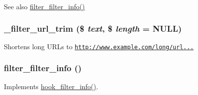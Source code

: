 \begin{DoxySeeAlso}{See also}
\hyperlink{group__standard__filters_ga38089b90576e648c56228ee99c9c1767}{filter\_\-filter\_\-info()} 
\end{DoxySeeAlso}
\hypertarget{group__standard__filters_gae320ec54b6c197f3263c2d54a4477e55}{
\subsubsection[{\_\-filter\_\-url\_\-trim}]{\setlength{\rightskip}{0pt plus 5cm}\_\-filter\_\-url\_\-trim (\$ {\em text}, \/  \$ {\em length} = {\ttfamily NULL})}}
\label{group__standard__filters_gae320ec54b6c197f3263c2d54a4477e55}
Shortens long URLs to \href{http://www.example.com/long/url...}{\tt http://www.example.com/long/url...} \hypertarget{group__standard__filters_ga38089b90576e648c56228ee99c9c1767}{
\subsubsection[{filter\_\-filter\_\-info}]{\setlength{\rightskip}{0pt plus 5cm}filter\_\-filter\_\-info ()}}
\label{group__standard__filters_ga38089b90576e648c56228ee99c9c1767}
Implements \hyperlink{group__hooks_gaf2a2f2a46589420df896a0d42247f15a}{hook\_\-filter\_\-info()}. 